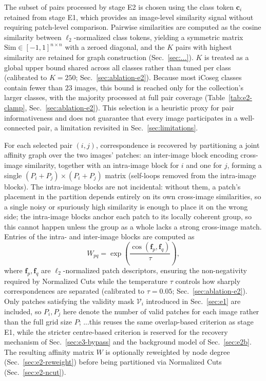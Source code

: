 The subset of pairs processed by stage E2 is chosen using the class token $\mathbf{c}_i$ retained from stage E1, which provides an image-level similarity signal without requiring patch-level comparison. Pairwise similarities are computed as the cosine similarity between $\ell_2$-normalized class tokens, yielding a symmetric matrix $\mathrm{Sim} \in [-1,1]^{n \times n}$ with a zeroed diagonal, and the $K$ pairs with highest similarity are retained for graph construction (Sec.~\ref{sec:...}). $K$ is treated as a global upper bound shared across all classes rather than tuned per class (calibrated to $K=250$;
Sec.~\ref{sec:ablation-e2}). Because most iCoseg classes
contain fewer than $23$ images, this bound is reached only for the
collection's larger classes, with the majority processed at full pair
coverage (Table~\ref{tab:e2-clamp}, Sec.~\ref{sec:ablation-e2}). This selection is a heuristic proxy for pair informativeness and does not guarantee that every image participates in a well-connected pair, a limitation revisited in Sec.~\ref{sec:limitations}.

\label{sec:e2-graph}
For each selected pair $(i,j)$, correspondence is recovered by partitioning a joint affinity graph over the two images' patches: an inter-image block encoding cross-image similarity, together with an intra-image block for $i$ and one for $j$, forming a single $(P_i+P_j)\times(P_i+P_j)$ matrix (self-loops removed from the intra-image blocks). The intra-image blocks are not incidental: without them, a patch's placement in the partition depends entirely on its own cross-image similarities, so a single noisy or spuriously high similarity is enough to place it on the wrong side; the intra-image blocks anchor each patch to its locally coherent group, so this cannot happen unless the group as a whole lacks a strong cross-image match. Entries of the intra- and inter-image blocks are computed as
\begin{equation}
    W_{pq} = \exp\!\left(\frac{\cos(\mathbf{f}_p, \mathbf{f}_q)}{\tau}\right),
    \label{eq:e2-kernel}
\end{equation}
where $\mathbf{f}_p, \mathbf{f}_q$ are $\ell_2$-normalized patch descriptors, ensuring the non-negativity required by Normalized Cuts while the temperature $\tau$ controls how sharply correspondences are separated (calibrated to $\tau=0.05$; Sec.~\ref{sec:ablation-e2}). Only patches satisfying the validity mask $\mathcal{V}_i$ introduced in Sec.~\ref{sec:e1} are included, so $P_i, P_j$ here denote the number of valid patches for each image rather than the full grid size $P$; ...this reuses the same overlap-based criterion as stage E1, while the stricter centre-based criterion is reserved for the recovery mechanism of Sec.~\ref{sec:e3-bypass} and the background model of Sec.~\ref{sec:e2b}. The resulting affinity matrix $W$ is optionally reweighted by node degree (Sec.~\ref{sec:e2-reweight}) before being partitioned via Normalized Cuts (Sec.~\ref{sec:e2-ncut}).


